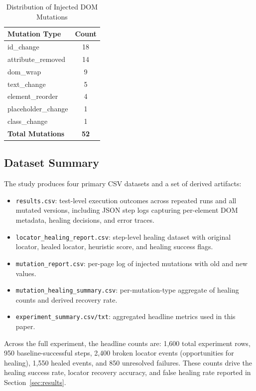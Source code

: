 \documentclass[conference]{IEEEtran}
\begin{document}
\begin{table}[H]
\centering
\caption{Distribution of Injected DOM Mutations}
\label{tab:dom_mutations_full}
\begin{tabular}{lc}
\toprule
\textbf{Mutation Type} & \textbf{Count} \\
\midrule
id\_change & 18 \\
attribute\_removed & 14 \\
dom\_wrap & 9 \\
text\_change & 5 \\
element\_reorder & 4 \\
placeholder\_change & 1 \\
class\_change & 1 \\
\midrule
\textbf{Total Mutations} & \textbf{52} \\
\bottomrule
\end{tabular}
\end{table}

\subsection{Dataset Summary}
The study produces four primary CSV datasets and a set of derived artifacts:
\begin{itemize}[leftmargin=1.2em]
    \item \texttt{results.csv}: test-level execution outcomes across repeated runs and all mutated versions, including JSON step logs capturing per-element DOM metadata, healing decisions, and error traces.
    \item \texttt{locator\_healing\_report.csv}: step-level healing dataset with original locator, healed locator, heuristic score, and healing success flags.
    \item \texttt{mutation\_report.csv}: per-page log of injected mutations with old and new values.
    \item \texttt{mutation\_healing\_summary.csv}: per-mutation-type aggregate of healing counts and derived recovery rate.
    \item \texttt{experiment\_summary.csv/txt}: aggregated headline metrics used in this paper.
\end{itemize}

Across the full experiment, the headline counts are: 1{,}600 total experiment rows, 950 baseline-successful steps, 2{,}400 broken locator events (opportunities for healing), 1{,}550 healed events, and 850 unresolved failures. These counts drive the healing success rate, locator recovery accuracy, and false healing rate reported in Section~\ref{sec:results}.
\end{document}
